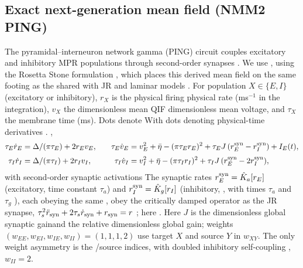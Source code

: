 \documentclass[11pt,a4paper]{article}
\providecommand{\DIFaddtex}[1]{{\protect\color{blue} \sf #1}} %
\providecommand{\DIFdeltex}[1]{{\protect\color{red} \scriptsize #1}} %
\providecommand{\DIFaddbegin}{} %
\providecommand{\DIFaddend}{} %
\providecommand{\DIFdelbegin}{} %
\providecommand{\DIFdelend}{} %
\providecommand{\DIFadd}[1]{\texorpdfstring{\DIFaddtex{#1}}{#1}} %
\providecommand{\DIFdel}[1]{\texorpdfstring{\DIFdeltex{#1}}{}} %
\begin{document}
\subsection{Exact next-generation mean field (NMM2 PING)}\label{sec:nmm2-methods}
The pyramidal--interneuron network gamma (PING) circuit couples excitatory
and inhibitory MPR populations through second-order synapses
\cite{montbrio2015,ruffini2021nmm2,clusella2023}\DIFdelbegin \DIFdel{.
We use }\DIFdelend \DIFaddbegin \DIFadd{, using }\DIFaddend the Rosetta Stone
formulation \DIFdelbegin \DIFdel{\cite{ruffini2025rosetta}, which places this
derived mean field on the same footing as the }\DIFdelend \DIFaddbegin \DIFadd{shared with }\DIFaddend JR and laminar models \DIFaddbegin \DIFadd{\cite{ruffini2025rosetta}}\DIFaddend .
For population $X\in\{E,I\}$\DIFdelbegin \DIFdel{(excitatory or inhibitory)}\DIFdelend , $r_X$ is \DIFdelbegin \DIFdel{the physical firing }\DIFdelend \DIFaddbegin \DIFadd{physical }\DIFaddend rate (ms$^{-1}$\DIFdelbegin \DIFdel{in the integration}\DIFdelend ),
$v_X$ \DIFdelbegin \DIFdel{the dimensionless mean QIF
}\DIFdelend \DIFaddbegin \DIFadd{dimensionless mean }\DIFaddend voltage, and $\tau_X$ \DIFdelbegin \DIFdel{the }\DIFdelend membrane time (ms).
\DIFdelbegin \DIFdel{Dots denote }\DIFdelend \DIFaddbegin \DIFadd{With dots denoting }\DIFaddend physical-time derivatives\DIFdelbegin \DIFdel{.
}\DIFdelend \DIFaddbegin \DIFadd{,
}\DIFaddend \begin{equation}
\begin{aligned}
\tau_E\dot r_E&=\Delta/(\pi\tau_E)+2r_Ev_E, &\quad
\tau_E\dot v_E&=v_E^2+\bar\eta-(\pi\tau_E r_E)^2+\tau_E J\,(r_E^{\rm syn}-r_I^{\rm syn})+I_E(t),\\[2pt]
\tau_I\dot r_I&=\Delta/(\pi\tau_I)+2r_Iv_I, &\quad
\tau_I\dot v_I&=v_I^2+\bar\eta-(\pi\tau_I r_I)^2+\tau_I J\,(r_E^{\rm syn}-2r_I^{\rm syn}),
\end{aligned}
\label{eq:nmm2-ping}
\end{equation}
\DIFdelbegin \DIFdel{with second-order synaptic activations }\DIFdelend \DIFaddbegin \DIFadd{The synaptic rates }\DIFaddend $r_E^{\rm syn}=\hat K_a[r_E]$ \DIFdelbegin \DIFdel{(excitatory, time constant
$\tau_a$) }\DIFdelend and
$r_I^{\rm syn}=\hat K_g[r_I]$\DIFdelbegin \DIFdel{(inhibitory, }\DIFdelend \DIFaddbegin \DIFadd{, with times $\tau_a$ and }\DIFaddend $\tau_g$\DIFdelbegin \DIFdel{),
each obeying the same
}\DIFdelend \DIFaddbegin \DIFadd{,
obey the }\DIFaddend critically damped operator
\DIFdelbegin \DIFdel{as the JR synapse, }\DIFdelend $\tau_s^2\ddot r_{\rm syn}+2\tau_s\dot r_{\rm syn}+r_{\rm syn}=r$\DIFdelbegin \DIFdel{; here }\DIFdelend \DIFaddbegin \DIFadd{.
Here }\DIFaddend $J$ is \DIFdelbegin \DIFdel{the dimensionless global synaptic gainand the relative }\DIFdelend \DIFaddbegin \DIFadd{dimensionless global gain; }\DIFaddend weights
$(w_{EE},w_{EI},w_{IE},w_{II})=(1,1,1,2)$ use target\DIFdelbegin \DIFdel{$X$ and source $Y$ in $w_{XY}$. The only weight asymmetry is the
}\DIFdelend \DIFaddbegin \DIFadd{/source indices,
with }\DIFaddend doubled inhibitory self-coupling \DIFdelbegin \DIFdel{, $w_{II}=2$.
}%
\end{document}
